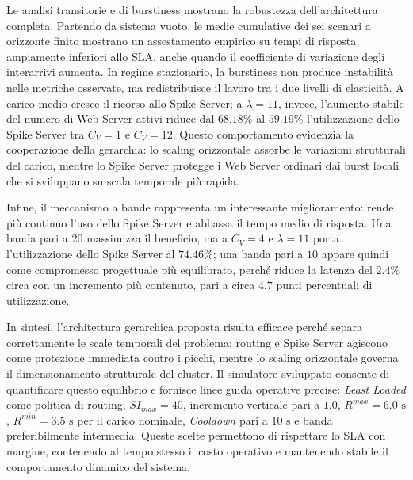 ﻿\documentclass[a4paper,12pt]{article}
\begin{document}
Le analisi transitorie e di burstiness mostrano la robustezza dell'architettura completa. Partendo da sistema vuoto, le medie cumulative dei sei scenari a orizzonte finito mostrano un assestamento empirico su tempi di risposta ampiamente inferiori allo SLA, anche quando il coefficiente di variazione degli interarrivi aumenta. In regime stazionario, la burstiness non produce instabilità nelle metriche osservate, ma redistribuisce il lavoro tra i due livelli di elasticità. A carico medio cresce il ricorso allo Spike Server; a $\lambda=11$, invece, l'aumento stabile del numero di Web Server attivi riduce dal $68.18\%$ al $59.19\%$ l'utilizzazione dello Spike Server tra $C_V=1$ e $C_V=12$. Questo comportamento evidenzia la cooperazione della gerarchia: lo scaling orizzontale assorbe le variazioni strutturali del carico, mentre lo Spike Server protegge i Web Server ordinari dai burst locali che si sviluppano su scala temporale più rapida.

Infine, il meccanismo a bande rappresenta un interessante miglioramento: rende più continuo l'uso dello Spike Server e abbassa il tempo medio di risposta. Una banda pari a $20$ massimizza il beneficio, ma a $C_V=4$ e $\lambda=11$ porta l'utilizzazione dello Spike Server al $74.46\%$; una banda pari a $10$ appare quindi come compromesso progettuale più equilibrato, perché riduce la latenza del $2.4\%$ circa con un incremento più contenuto, pari a circa $4.7$ punti percentuali di utilizzazione.

In sintesi, l'architettura gerarchica proposta risulta efficace perché separa correttamente le scale temporali del problema: routing e Spike Server agiscono come protezione immediata contro i picchi, mentre lo scaling orizzontale governa il dimensionamento strutturale del cluster. Il simulatore sviluppato consente di quantificare questo equilibrio e fornisce linee guida operative precise: \textit{Least Loaded} come politica di routing, $SI_{max}=40$, incremento verticale pari a $1.0$, $R^{max}=6.0\text{ s}$, $R^{min}=3.5\text{ s}$ per il carico nominale, \textit{Cooldown} pari a $10\text{ s}$ e banda preferibilmente intermedia. Queste scelte permettono di rispettare lo SLA con margine, contenendo al tempo stesso il costo operativo e mantenendo stabile il comportamento dinamico del sistema.

\newpage
\end{document}
